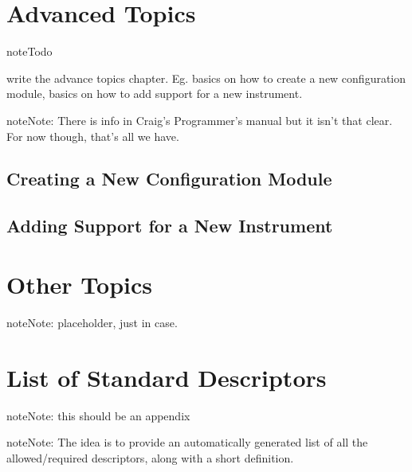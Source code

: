 \documentclass[letterpaper,10pt,english]{sphinxmanual}
\begin{document}
\chapter{Advanced Topics}
\label{advanced:advanced-topics}\label{advanced::doc}\label{advanced:advanced}
\begin{notice}{note}{Todo}

write the advance topics chapter.  Eg. basics on how to create a new configuration
module, basics on how to add support for a new instrument.
\end{notice}

\begin{notice}{note}{Note:}
There is info in Craig's Programmer's manual but it isn't that clear.  For now
though, that's all we have.
\end{notice}


\section{Creating a New Configuration Module}
\label{advanced:creating-a-new-configuration-module}

\section{Adding Support for a New Instrument}
\label{advanced:adding-support-for-a-new-instrument}

\chapter{Other Topics}
\label{other:other-topics}\label{other::doc}
\begin{notice}{note}{Note:}
placeholder, just in case.
\end{notice}


\chapter{List of Standard Descriptors}
\label{descriptors:list-of-standard-descriptors}\label{descriptors::doc}
\begin{notice}{note}{Note:}
this should be an appendix
\end{notice}

\begin{notice}{note}{Note:}
The idea is to provide an automatically generated list of all
the allowed/required descriptors, along with a short definition.
\end{notice}
\end{document}
